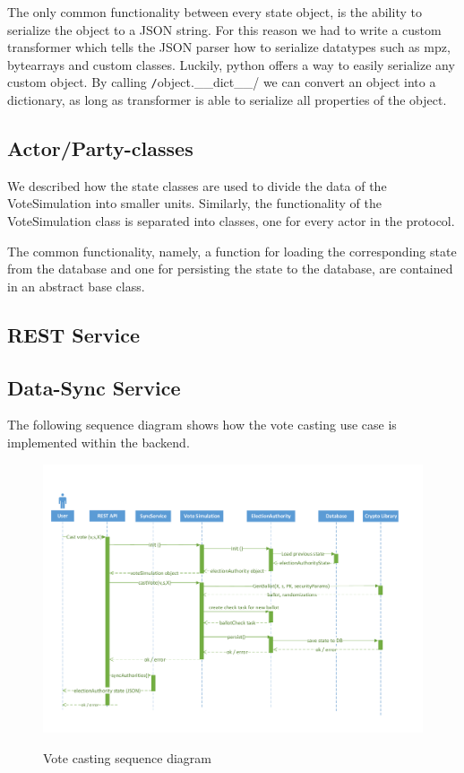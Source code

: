 
The only common functionality between every state object, is the ability to serialize the object to a JSON string. For this reason we had to write a custom transformer which tells the JSON parser how to serialize datatypes such as mpz, bytearrays and custom classes. Luckily, python offers a way to easily serialize any custom object. By calling \texttt/object.__dict__/ we can convert an object into a dictionary, as long as transformer is able to serialize all properties of the object.

\subsection{Actor/Party-classes}
We described how the state classes are used to divide the data of the VoteSimulation into smaller units. Similarly, the functionality of the VoteSimulation class is separated into classes, one for every actor in the protocol.


The common functionality, namely, a function for loading the corresponding state from the database and one for persisting the state to the database, are contained in an abstract base class.

\subsection{REST Service}
\subsection{Data-Sync Service}

The following sequence diagram shows how the vote casting use case is implemented within the backend.
\begin{figure}[h!]
\begin{center}
\includegraphics[scale=0.65]{assets/votecastingDiagram.pdf}\\
\caption{Vote casting sequence diagram}
\end{center}
\end{figure}

